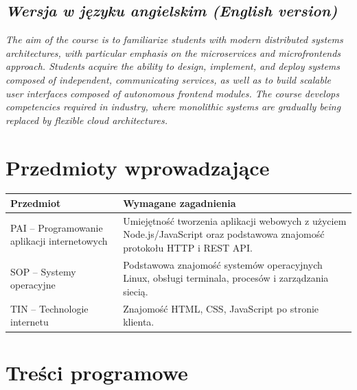 \documentclass[12pt, a4paper]{article}
\newcommand{\thdrule}{\noalign{\global\setlength{\extrarowheight}{0pt}}}
\newcommand{\thdend}{\noalign{\global\setlength{\extrarowheight}{3pt}}}
\begin{document}
\subsection*{\textit{Wersja w języku angielskim (English version)}}

\textit{The aim of the course is to familiarize students with modern distributed systems architectures, with particular emphasis on the microservices and microfrontends approach. Students acquire the ability to design, implement, and deploy systems composed of independent, communicating services, as well as to build scalable user interfaces composed of autonomous frontend modules. The course develops competencies required in industry, where monolithic systems are gradually being replaced by flexible cloud architectures.}


\section{Przedmioty wprowadzające}

{\scriptsize
\begin{tabularx}{\textwidth}{m{5cm}Y}
\thdrule\toprule
{} {\color{white}\textbf{Przedmiot}} & {\color{white}\textbf{Wymagane zagadnienia}} \\
\midrule\thdend
   PAI – Programowanie aplikacji internetowych & Umiejętność tworzenia aplikacji webowych z użyciem Node.js/JavaScript oraz podstawowa znajomość protokołu HTTP i REST API. \\
   SOP – Systemy operacyjne & Podstawowa znajomość systemów operacyjnych Linux, obsługi terminala, procesów i zarządzania siecią. \\
   TIN – Technologie internetu & Znajomość HTML, CSS, JavaScript po stronie klienta. \\
\bottomrule
\end{tabularx}}

\section{Treści programowe}
\end{document}
